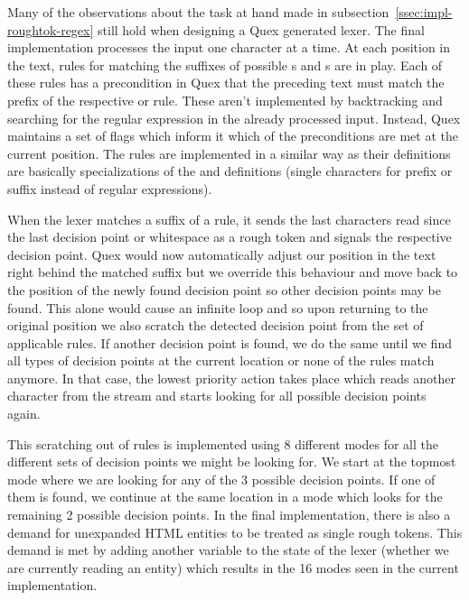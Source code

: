 Many of the observations about the task at hand made in
subsection~\ref{ssec:impl-roughtok-regex} still hold when designing a Quex
generated lexer. The final implementation processes the input one character
at a time. At each position in the text, rules for matching the suffixes of
possible \maysplit{}s and \mayjoin{}s are in play. Each of these rules has a
precondition in Quex that the preceding text must match the prefix of the
respective \maysplit{} or \mayjoin{} rule. These aren't implemented by
backtracking and searching for the regular expression in the already processed
input. Instead, Quex maintains a set of flags which inform it which of the
preconditions are met at the current position. The \maybreaksentence{} rules
are implemented in a similar way as their definitions are basically
specializations of the \maysplit{} and \mayjoin{} definitions (single
characters for prefix or suffix instead of regular expressions).

When the lexer matches a suffix of a rule, it sends the last characters read
since the last decision point or whitespace as a rough token and signals the
respective decision point. Quex would now automatically adjust our position in
the text right behind the matched suffix but we override this behaviour and
move back to the position of the newly found decision point so other decision
points may be found. This alone would cause an infinite loop and so upon
returning to the original position we also scratch the detected decision point
from the set of applicable rules. If another decision point is found, we do the
same until we find all types of decision points at the current location or none
of the rules match anymore. In that case, the lowest priority action takes
place which reads another character from the stream and starts looking for all
possible decision points again.

This scratching out of rules is implemented using 8 different modes for all the
different sets of decision points we might be looking for. We start at the
topmost mode where we are looking for any of the 3 possible decision points. If
one of them is found, we continue at the same location in a mode which looks
for the remaining 2 possible decision points. In the final implementation,
there is also a demand for unexpanded HTML entities to be treated as single
rough tokens. This demand is met by adding another variable to the state of the
lexer (whether we are currently reading an entity) which results in the 16
modes seen in the current implementation.

